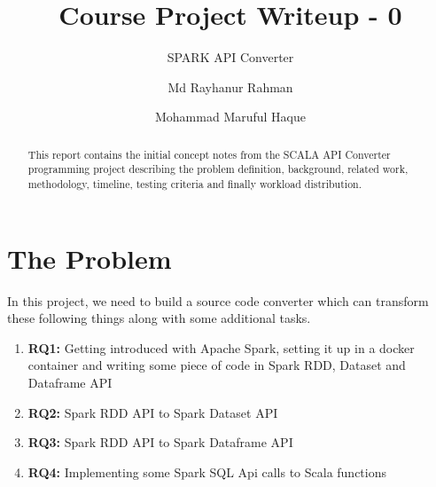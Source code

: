 \documentclass[sigplan, review]{acmart}\settopmatter{printfolios=true,printccs=false,printacmref=false}
\begin{document}
\title[Course Project Writeup - 0]{Course Project Writeup - 0}         
\subtitle{SPARK API Converter}                    


\author{Md Rayhanur Rahman}

\author{Mohammad Maruful Haque}


\begin{abstract}
This report contains the initial concept notes from the SCALA API Converter programming project describing the problem definition, background, related work, methodology, timeline, testing criteria and finally workload distribution.
\end{abstract}

\maketitle


\section{The Problem}
In this project, we need to build a source code converter which can transform these following things along with some additional tasks. 
\begin{enumerate}
	\item \textbf{RQ1:} Getting introduced with Apache Spark, setting it up in a docker container and writing some piece of code in Spark RDD, Dataset and Dataframe API
	\item \textbf{RQ2:} Spark RDD API to Spark Dataset API
	\item \textbf{RQ3:} Spark RDD API to Spark Dataframe API
	\item \textbf{RQ4:} Implementing some Spark SQL Api calls to Scala functions
\end{enumerate}
\end{document}
